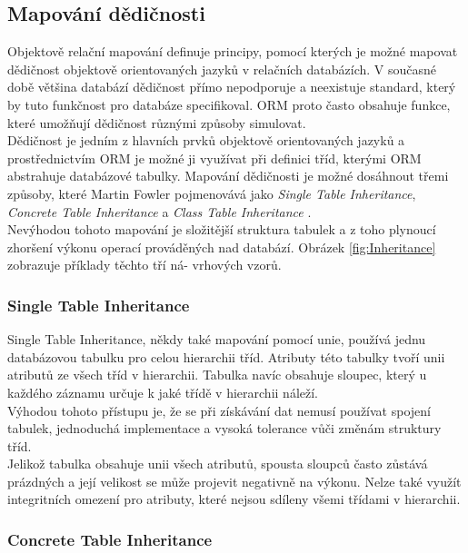 \documentclass[ing,male,java,dept456]{diploma}						%
\begin{document}
\subsection{Mapování dědičnosti}
\label{subsec:Inhmapping}
Objektově relační mapování definuje principy, pomocí kterých je možné mapovat dědičnost objektově orientovaných jazyků v relačních databázích. V současné době většina databází dědičnost přímo nepodporuje a neexistuje standard, který by tuto funkčnost pro databáze specifikoval. ORM proto často obsahuje funkce, které umožňují dědičnost různými způsoby simulovat. \\
Dědičnost je jedním z hlavních prvků objektově orientovaných jazyků a prostřednictvím ORM je možné ji využívat při definici tříd, kterými ORM abstrahuje databázové tabulky. Mapování dědičnosti je možné dosáhnout třemi způsoby, které Martin Fowler pojmenovává jako \textit{Single Table Inheritance}, \textit{Concrete Table Inheritance} a \textit{Class Table Inheritance} \cite{fowler}. \\
Nevýhodou tohoto mapování je složitější struktura tabulek a z toho plynoucí zhoršení výkonu operací prováděných nad databází. Obrázek \ref{fig:Inheritance} zobrazuje příklady těchto tří ná- vrhových vzorů.


\subsubsection{Single Table Inheritance}

Single Table Inheritance, někdy také mapování pomocí unie, používá jednu databázovou tabulku pro celou hierarchii tříd. Atributy této tabulky tvoří unii atributů ze všech tříd v hierarchii. Tabulka navíc obsahuje sloupec, který u každého záznamu určuje k jaké třídě v hierarchii náleží. \\
Výhodou tohoto přístupu je, že se při získávání dat nemusí používat spojení tabulek, jednoduchá implementace a vysoká tolerance vůči změnám struktury tříd. \\
Jelikož tabulka obsahuje unii všech atributů, spousta sloupců často zůstává prázdných a její velikost se může projevit negativně na výkonu. Nelze také využít integritních omezení pro atributy, které nejsou sdíleny všemi třídami v hierarchii.

\subsubsection{Concrete Table Inheritance}
\end{document}
